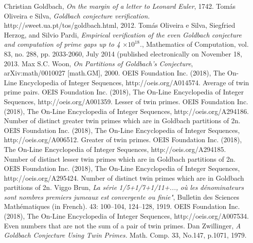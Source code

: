 \documentclass[10pt,twocolumn]{article}
\begin{document}
\begin{thebibliography}{9}
  Christian Goldbach, 
  \emph{On the margin of a letter to Leonard Euler},
  1742.
  Tomás Oliveira e Silva,
  \emph{Goldbach conjecture verification.}
  http://sweet.ua.pt/tos/goldbach.html,
  2012.
  Tomás Oliveira e Silva, Siegfried Herzog, and Silvio Pardi, 
  \emph{Empirical verification of the even Goldbach conjecture and computation of prime gaps up to 4 $\times 10^{18}$.}, 
  Mathematics of Computation, vol. 83, no. 288, pp. 2033-2060, 
  July 2014 (published electronically on November 18, 2013.
  Max S.C. Woon,
  \emph{On Partitions of Goldbach's Conjecture}, arXiv:math/0010027 [math.GM], 2000.  
  OEIS Foundation Inc. (2018), The On-Line Encyclopedia of Integer Sequences, http://oeis.org/A014574. Average of twin prime pairs.
  OEIS Foundation Inc. (2018), The On-Line Encyclopedia of Integer Sequences, http://oeis.org/A001359. Lesser of twin primes.
  OEIS Foundation Inc. (2018), The On-Line Encyclopedia of Integer Sequences, http://oeis.org/A294186. Number of distinct greater twin primes which are in Goldbach partitions of 2n.
  OEIS Foundation Inc. (2018), The On-Line Encyclopedia of Integer Sequences, http://oeis.org/A006512. Greater of twin primes. 
  OEIS Foundation Inc. (2018), The On-Line Encyclopedia of Integer Sequences, http://oeis.org/A294185. Number of distinct lesser twin primes which are in Goldbach partitions of 2n.
  OEIS Foundation Inc. (2018), The On-Line Encyclopedia of Integer Sequences, http://oeis.org/A295424. Number of distinct twin primes which are in Goldbach partitions of 2n.
  Viggo Brun,
  \emph{La série 1/5+1/7+1/11+..., où les dénominateurs sont nombres premiers jumeaux est convergente ou finie"},
  Bulletin des Sciences Mathématiques (in French). 43: 100–104, 124–128, 
  1919.
  OEIS Foundation Inc. (2018), The On-Line Encyclopedia of Integer Sequences, http://oeis.org/A007534. Even numbers that are not the sum of a pair of twin primes.
  Dan Zwillinger, 
  \emph{A Goldbach Conjecture Using Twin Primes.}
  Math. Comp. 33, No.147, p.1071,
  1979.
  
\end{thebibliography}
\end{document}
